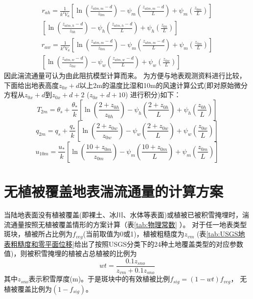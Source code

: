 \begin{equation}
\begin{array}{c}r_{a h}=\frac{1}{k^{2} V_{a}}\left[\ln \left(\frac{z_{atm, m}-d}{z_{0 m}}\right)-\psi_{m}\left(\frac{z_{atm, m}-d}{L}\right)+\psi_{m}\left(\frac{z_{0 m}}{L}\right)\right] \\ {\left[\ln \left(\frac{z_{atm, h}-d}{z_{0 h}}\right)-\psi_{h}\left(\frac{z_{atm, h}-d}{L}\right)+\psi_{h}\left(\frac{z_{0 h}}{L}\right)\right]}\end{array}
\end{equation}
\begin{equation}
\begin{array}{c}r_{a w}=\frac{1}{k^{2} V_{a}}\left[\ln \left(\frac{z_{atm, m}-d}{z_{0 m}}\right)-\psi_{m}\left(\frac{z_{atm, m}-d}{L}\right)+\psi_{m}\left(\frac{z_{0 m}}{L}\right)\right] \\ {\left[\ln \left(\frac{z_{atm, w}-d}{z_{0 w}}\right)-\psi_{w}\left(\frac{z_{atm, w}-d}{L}\right)+\psi_{w}\left(\frac{z_{0 w}}{L}\right)\right]}\end{array}
\end{equation}
因此湍流通量可认为由此阻抗模型计算而来。
为方便与地表观测资料进行比较，下面给出地表高度$z_{0x}+d$以上2m的温度比湿和10m的风速计算公式(即对原始微分方程从$z_{0x}+d$到$z_{0x}+d+2$ ($z_{0x}+d+10$) 进行积分)如下：
\begin{equation}
T_{2 m}=\theta_{s}+\frac{\theta_{*}}{k}\left[\ln \left(\frac{2+z_{0 h}}{z_{0 h}}\right)-\psi_{h}\left(\frac{2+z_{0 h}}{L}\right)+\psi_{h}\left(\frac{z_{0 h}}{L}\right)\right]
\end{equation}
\begin{equation}
q_{2 m}=q_{s}+\frac{q_{*}}{k}\left[\ln \left(\frac{2+z_{0 w}}{z_{0 w}}\right)-\psi_{w}\left(\frac{2+z_{0 w}}{L}\right)+\psi_{w}\left(\frac{z_{0 w}}{L}\right)\right]
\end{equation}
\begin{equation}
u_{10 m}=\frac{u_{*}}{k}\left[\ln \left(\frac{10+z_{0 m}}{z_{0 m}}\right)-\psi_{m}\left(\frac{10+z_{0 m}}{L}\right)+\psi_{m}\left(\frac{z_{0 m}}{L}\right)\right]
\end{equation}


\section{无植被覆盖地表湍流通量的计算方案}\label{无植被覆盖地表湍流通量的计算方案}
当陆地表面没有植被覆盖(即裸土、冰川、水体等表面)或植被已被积雪掩埋时，湍流通量按照无植被覆盖情形的方案计算（表\ref{tab:物理常数} ）。
对于任一地表类型斑块，植被所占比例为$f_{veg}$(当前取值为0或1)，植被粗糙度为$z_{vm}$
(表\ref{tab:USGS地表粗糙度和零平面位移}给出了按照USGS分类下的24种土地覆盖类型的对应参数值)，则被积雪掩埋的植被占总植被的比例为
\begin{equation}
wt=\frac{0.1 z_{{sno}}}{z_{v m}+0.1 z_{{sno}}}
\end{equation}
其中$z_{sno}$表示积雪厚度(m)。于是斑块中的有效植被比例$f_{sig}=\left(1-wt\right)f_{veg}$，
无植被覆盖比例为$\left(1-f_{sig}\right)$。

